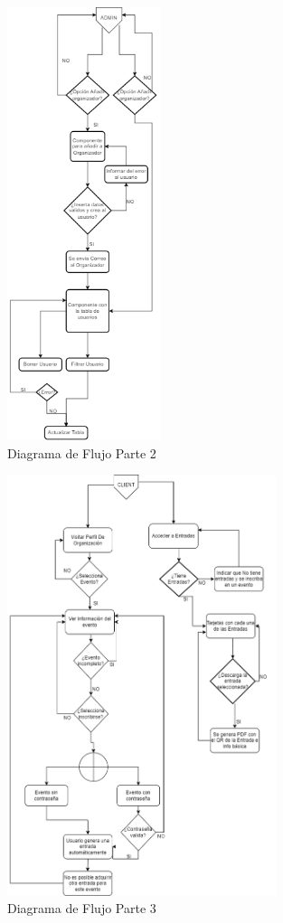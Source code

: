 \begin{figure}[h]
    \centering
    \includegraphics[width=0.4\textwidth]{AdminFlujo.png} 
    \caption{Diagrama de Flujo Parte 2}
    \label{fig:flujoEvs1}
\end{figure}
\newpage
\begin{figure}[h]
    \centering
    \includegraphics[width=0.7\textwidth]{Cliente.png} 
    \caption{Diagrama de Flujo Parte 3}
    \label{fig:flujoEvs2}
\end{figure}
